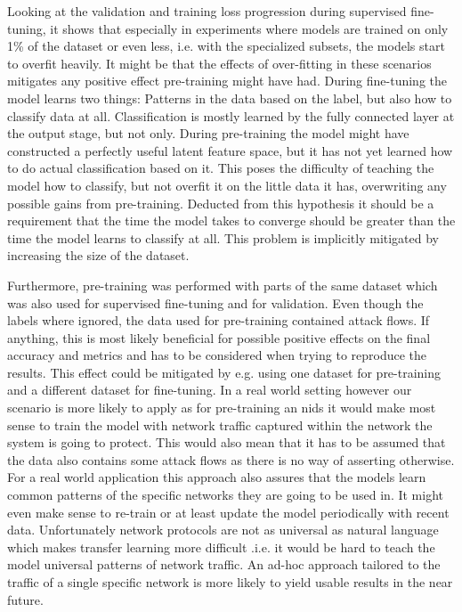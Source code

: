 Looking at the validation and training loss progression during supervised fine-tuning, it shows that especially in experiments where models are trained on only 1\% of the dataset or even less, i.e. with the specialized subsets, the models start to overfit heavily. It might be that the effects of over-fitting in these scenarios mitigates any positive effect pre-training might have had. During fine-tuning the model learns two things: Patterns in the data based on the label, but also how to classify data at all. Classification is mostly learned by the fully connected layer at the output stage, but not only. During pre-training the model might have constructed a perfectly useful latent feature space, but it has not yet learned how to do actual classification based on it. This poses the difficulty of teaching the model how to classify, but not overfit it on the little data it has, overwriting any possible gains from pre-training. Deducted from this hypothesis it should be a requirement that the time the model takes to converge should be greater than the time the model learns to classify at all. This problem is implicitly mitigated by increasing the size of the dataset.\par

Furthermore, pre-training was performed with parts of the same dataset which was also used for supervised fine-tuning and for validation. Even though the labels where ignored, the data used for pre-training contained attack flows. If anything, this is most likely beneficial for possible positive effects on the final accuracy and metrics and has to be considered when trying to reproduce the results. This effect could be mitigated by e.g. using one dataset for pre-training and a different dataset for fine-tuning. In a real world setting however our scenario is more likely to apply as for pre-training an \gls{nids} it would make most sense to train the model with network traffic captured within the network the system is going to protect. This would also mean that it has to be assumed that the data also contains some attack flows as there is no way of asserting otherwise. For a real world application this approach also assures that the models learn common patterns of the specific networks they are going to be used in. It might even make sense to re-train or at least update the model periodically with recent data. Unfortunately network protocols are not as universal as natural language which makes transfer learning more difficult .i.e. it would be hard to teach the model universal patterns of network traffic. An ad-hoc approach tailored to the traffic of a single specific network is more likely to yield usable results in the near future. \par

